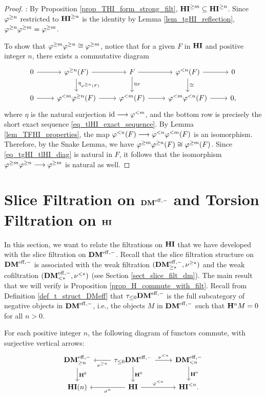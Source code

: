 \begin{proof}
 : By Proposition \ref{prop_THI_form_strong_filt},
$\THI{m} \subseteq \THI{n}$. Since $\tgHI{n}$ restricted to
$\THI{n}$ is the identity by Lemma \ref{lem_tgHI_reflection}, 
$\tgHI{n} \tgHI{m} = \tgHI{m}$. 

To show that $\tgHI{m} \tgHI{n} \cong \tgHI{m}$, notice that
for a given $F$ in $\HI$ and positive integer $n$, there exists a 
commutative diagram
\begin{equation}\label{eq_tgHI_tlHI_diag}
\begin{tikzcd}
0 \arrow{r} &
\tgHI{n}(F) \arrow{r} \arrow{d}{\eta_{\tgHI{n}(F)}} &
F \arrow{r} \arrow{d}{\eta_F} &
\tlHI{n}(F) \arrow{r} \arrow{d}{\cong} &
0 \\
0 \arrow{r} &
\tlHI{m} \tgHI{n}(F) \arrow{r} &
\tlHI{m}(F) \arrow{r} &
\tlHI{m}\tlHI{n}(F) \arrow{r} &
0,
\end{tikzcd}
\end{equation}
where $\eta$ is the natural surjection $\id \to \tlHI{m}$, and
the bottom row is precisely the short exact sequence 
\eqref{eq_tlHI_exact_sequence}. By Lemma 
\ref{lem_TFHI_properties}, the map $\tlHI{n}(F) \to \tlHI{n} 
\tlHI{m}(F)$ is an isomorphism. Therefore, by the Snake Lemma, we 
have $\tgHI{m} \tgHI{n}(F) \cong \tgHI{m}(F)$. Since 
\eqref{eq_tgHI_tlHI_diag} is natural in $F$, it follows that the 
isomorphism $\tgHI{m}\tgHI{n} \to \tgHI{m}$ is natural as well.
\end{proof}

\section{Slice Filtration on $\DMeff$ and Torsion Filtration on $\HI$}
\label{sect_relation_sfilt_tfilt}

In this section, we want to relate the filtrations on $\HI$
that we have developed with the slice filtration on $\DMeff$. 
Recall that the slice filtration structure on $\DMeff$ is 
associated with the weak filtration $(\GFiltDM[*]{\DMeff}, 
\sgDM{*})$ and the weak cofiltration $(\LFiltDM[*]{\DMeff}, 
\slDM{*})$ (see Section \ref{sect_slice_filt_dm}). The main result 
that we will verify is Proposition \ref{prop_H_commute_with_filt}.
Recall from Definition \ref{def_t_struct_DMeff} that 
$\tau_{\leq 0}\DMeff$ is the full subcategory of negative objects in
$\DMeff$, i.e., the objects $M$ in $\DMeff$ such that $\HH^nM = 0$
for all $n > 0$.

\begin{prop}\label{prop_H_commute_with_filt}
For each positive integer $n$, the following diagram of functors 
commute, with surjective vertical arrows:
\[
\begin{tikzcd}
\GFiltDM[n]{\DMeff} \arrow{d}{\HH^0} &
\tau_{\leq 0}\DMeff \arrow{l}{\sgDM{n}} \arrow{r}{\slDM{n}} \arrow{d}{\HH^0} &
\LFiltDM[n]{\DMeff} \arrow{d}{\HH^0} \\
\HI(n) &
\HI \arrow{l}{\sgHI{n}}\arrow{r}{\tlHI{n}} &
\TFHI{n}.
\end{tikzcd}
\]
\end{prop}

